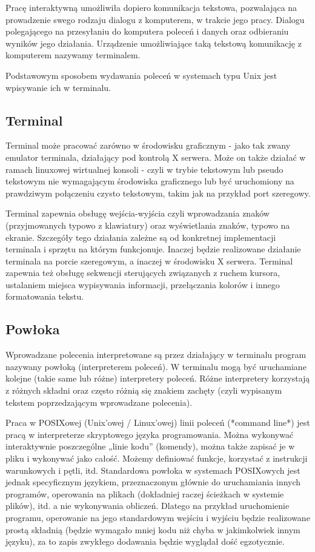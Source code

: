 Pracę interaktywną umożliwiła dopiero komunikacja tekstowa, pozwalająca na prowadzenie swego rodzaju dialogu z komputerem, w trakcie jego pracy.
Dialogu polegającego na przesyłaniu do komputera poleceń i danych oraz odbieraniu wyników jego działania.
Urządzenie umożliwiające taką tekstową komunikację z komputerem nazywamy terminalem.

Podstawowym sposobem wydawania poleceń w systemach typu Unix jest wpisywanie ich w terminalu.

\subsection{Terminal}

Terminal może pracować zarówno w środowisku graficznym - jako tak zwany emulator terminala, działający pod kontrolą X serwera. Może on także działać w ramach linuxowej wirtualnej konsoli - czyli w trybie tekstowym lub pseudo tekstowym nie wymagającym środowiska graficznego lub być uruchomiony na prawdziwym połączeniu czysto tekstowym, takim jak na przykład port szeregowy.

Terminal zapewnia obsługę wejścia-wyjścia czyli wprowadzania znaków (przyjmowanych typowo z klawiatury) oraz wyświetlania znaków, typowo na ekranie. Szczegóły tego działania zależne są od konkretnej implementacji terminala i sprzętu na którym funkcjonuje. Inaczej będzie realizowane działanie terminala na porcie szeregowym, a inaczej w środowisku X serwera. Terminal zapewnia też obsługę sekwencji sterujących związanych z ruchem kursora, ustalaniem miejsca wypisywania informacji, przełączania kolorów i innego formatowania tekstu.

\subsection{Powłoka}

Wprowadzane polecenia interpretowane są przez działający w terminalu program nazywany powłoką (interpreterem poleceń).
W terminalu mogą być uruchamiane kolejne (takie same lub różne) interpretery poleceń.
Różne interpretery korzystają z różnych składni oraz często różnią się znakiem zachęty (czyli wypisanym tekstem poprzedzającym wprowadzane polecenia).

Praca w POSIXowej (Unix'owej / Linux'owej) linii poleceń (*command line*) jest pracą w interpreterze skryptowego języka programowania. Można wykonywać interaktywnie poszczególne „linie kodu” (komendy), można także zapisać je w pliku i wykonywać jako całość. Możemy definiować funkcje, korzystać z instrukcji warunkowych i pętli, itd. Standardowa powłoka w systemach POSIXowych jest jednak specyficznym językiem, przeznaczonym głównie do uruchamiania innych programów, operowania na plikach (dokładniej raczej ścieżkach w systemie plików), itd. a nie wykonywania obliczeń. Dlatego na przykład uruchomienie programu, operowanie na jego standardowym wejściu i wyjściu będzie realizowane prostą składnią (będzie wymagało mniej kodu niż chyba w jakimkolwiek innym języku), za to zapis zwykłego dodawania będzie wyglądał dość egzotycznie.

